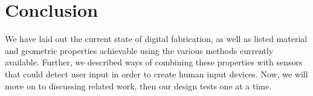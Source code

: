 \section{Conclusion}

We have laid out the current state of digital fabrication, as well as listed material and geometric properties achievable using the various methods currently available. Further, we described ways of combining these properties with sensors that could detect user input in order to create human input devices. Now, we will move on to discussing related work, then our design tests one at a time.
